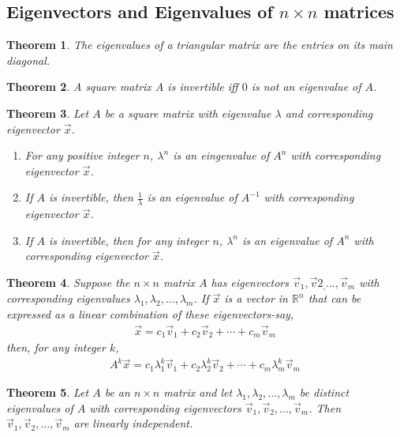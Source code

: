 \documentclass{article}
\theoremstyle{sltheorem}
\newtheorem{theorem}{Theorem}[section]
\begin{document}
\subsection{Eigenvectors and Eigenvalues of $n\times n$ matrices}
\setcounter{theorem}{14}
\begin{theorem}
    The eigenvalues of a triangular matrix are the entries on its main diagonal.
\end{theorem}
\begin{theorem}
    A square matrix $A$ is invertible iff $0$ is not an eigenvalue of $A$.
\end{theorem}
\setcounter{theorem}{17}
\begin{theorem}
    Let $A$ be a square matrix with eigenvalue $\lambda$ and corresponding eigenvector $\vec x$.
    \begin{enumerate}
        \item For any positive integer $n$, $\lambda^n$ is an eingenvalue of $A^n$ with corresponding eigenvector $\vec x$.
        \item If $A$ is invertible, then $\frac{1}{\lambda}$ is an eigenvalue of $A^{-1}$ with corresponding eigenvector $\vec x$.
        \item If $A$ is invertible, then for any integer $n$, $\lambda^n$ is an eigenvalue of $A^n$ with corresponding eigenvector $\vec x$.
    \end{enumerate}
\end{theorem}
\begin{theorem}
    Suppose the $n\times n$ matrix $A$ has eigenvectors $\vec v_1, \vec v2_, ..., \vec v_m$ with corresponding eigenvalues $\lambda_1, \lambda_2, ...,\lambda_m$. If $\vec x$ is a vector in $\mathbb{R}^n$ that can be expressed as a linear combination of these eigenvectors-say,
    \begin{align*}
        \vec x = c_1\vec v_1+c_2\vec v_2 +\cdots + c_m\vec v_m
    \end{align*}
    then, for any integer $k$,
    \begin{align*}
        A^k\vec x = c_1\lambda_1^k\vec v_1+c_2\lambda_2^k\vec v_2 + \cdots + c_m\lambda_m^k\vec v_m
    \end{align*}
\end{theorem}
\begin{theorem}
    Let $A$ be an $n\times n$ matrix and let $\lambda_1, \lambda_2, ...,\lambda_m$ be distinct eigenvalues of $A$ with corresponding eigenvectors $\vec v_1, \vec v_2, ..., \vec v_m$. Then $\vec v_1, \vec v_2, ...,\vec v_m$ are linearly independent.
\end{theorem}
\end{document}
